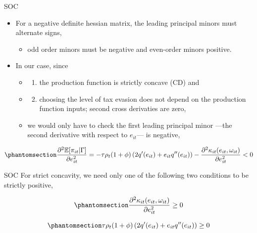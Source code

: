 \documentclass[
  ignorenonframetext,
  aspectratio=169,
]{beamer}
\providecommand{\tightlist}{%
  \setlength{\itemsep}{0pt}\setlength{\parskip}{0pt}}
\begin{document}
\begin{frame}{SOC}
\protect{}\label{soc}
\begin{itemize}
\tightlist
\item
  For a negative definite hessian matrix, the leading principal minors
  must alternate signs,

  \begin{itemize}
  \tightlist
  \item
    odd order minors must be negative and even-order minors positive.
  \end{itemize}
\item
  In our case, since

  \begin{itemize}
  \tightlist
  \item
    \begin{enumerate}
    [1)]
    \tightlist
    \item
      the production function is strictly concave (CD) and
    \end{enumerate}
  \item
    \begin{enumerate}
    [1)]
    \setcounter{enumi}{1}
    \tightlist
    \item
      choosing the level of tax evasion does not depend on the
      production function inputs; second cross derivaties are zero,
    \end{enumerate}
  \item
    we would only have to check the first leading principal minor ---the
    second derivative with respect to \(e_{it}\)--- is negative,
  \end{itemize}
\end{itemize}

\begin{equation}\protect\phantomsection\label{eq-soc-e}{
\frac{\partial^2 \mathbb{E}[\pi_{it}|\Gamma]}{\partial e_{it}^2} = -\tau\rho_t(1+\phi)\left(2 q'(e_{it})+ e_{it}q''(e_{it})\right) - \frac{\partial^2\kappa_{it}(e_{it}, \omega_{it})}{\partial e_{it}^2} < 0
}\end{equation}
\end{frame}

\begin{frame}{SOC}
\protect{}\label{soc-1}
For strict concavity, we need only one of the following two conditions
to be strictly positive,

\begin{equation}\protect\phantomsection\label{eq-soc-e-k}{
  \frac{\partial^2\kappa_{it}(e_{it}, \omega_{it})}{\partial e_{it}^2} \ge 0
}\end{equation}

\begin{equation}\protect\phantomsection\label{eq-soc-e-q}{
\tau\rho_t(1+\phi)\left(2 q'(e_{it})+ e_{it}q''(e_{it})\right) \ge 0
}\end{equation}
\end{frame}
\end{document}
